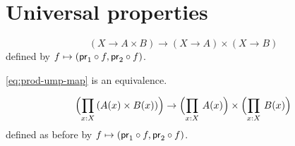 \documentclass[hott-all.tex]{subfiles}
\begin{document}
\section{Universal properties}
\label{sec:universal-properties}

\begin{equation}\label{eq:prod-ump-map}
  (X\to A\times B) \to (X\to A)\times (X\to B)
\end{equation}
defined by $f \mapsto (\mathsf{pr}_{1} \circ f, \mathsf{pr}_{2}\circ f)$.

\begin{thm}\label{thm:prod-ump}
  \eqref{eq:prod-ump-map} is an equivalence.
\end{thm}
%
%

\begin{equation}\label{eq:prod-umpd-map}
  \Parens{\prd{x:X} (A(x)\times B(x))} \to \Parens{\prd{x:X} A(x)} \times \Parens{\prd{x:X} B(x)}
\end{equation}
defined as before by $f \mapsto (\mathsf{pr}_{1} \circ f, \mathsf{pr}_{2}\circ f)$.
\end{document}
